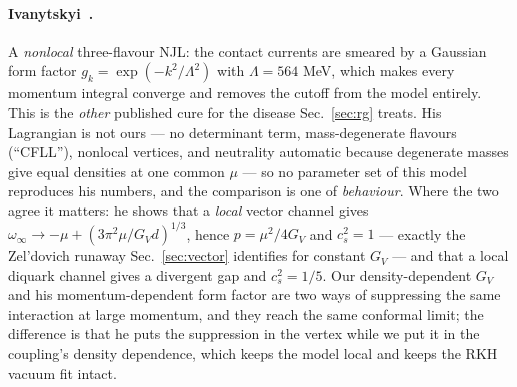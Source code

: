 \documentclass[aps,prc,onecolumn,superscriptaddress,nofootinbib,10pt]{revtex4-2}
\newcommand{\Lam}{\Lambda}
\newcommand{\GV}{G_V}
\begin{document}
\paragraph{Ivanytskyi~\cite{Ivanytskyi2025}.} A \emph{nonlocal} three-flavour
NJL: the contact currents are smeared by a Gaussian form factor
$g_k = \exp(-k^2/\Lam^2)$ with $\Lam = 564$ MeV, which makes every momentum
integral converge and removes the cutoff from the model entirely. This is the
\emph{other} published cure for the disease Sec.~\ref{sec:rg} treats. His
Lagrangian is not ours --- no determinant term, mass-degenerate flavours
(``CFLL''), nonlocal vertices, and neutrality automatic because degenerate
masses give equal densities at one common $\mu$ --- so no parameter set of this
model reproduces his numbers, and the comparison is one of \emph{behaviour}.
Where the two agree it matters: he shows that a \emph{local} vector channel
gives $\omega_\infty \to -\mu + (3\pi^2\mu/\GV d)^{1/3}$, hence
$p = \mu^2/4\GV$ and $c_s^2 = 1$ --- exactly the Zel'dovich runaway
Sec.~\ref{sec:vector} identifies for constant $\GV$ --- and that a local
diquark channel gives a divergent gap and $c_s^2 = 1/5$. Our density-dependent
$\GV$ and his momentum-dependent form factor are two ways of suppressing the
same interaction at large momentum, and they reach the same conformal limit;
the difference is that he puts the suppression in the vertex while we put it in
the coupling's density dependence, which keeps the model local and keeps the
RKH vacuum fit intact.
\end{document}
